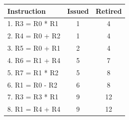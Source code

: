 \documentclass{article}
\begin{document}
\begin{enumerate}
\begin{figure}[H]
\begin{minipage}[t]{0.45\textwidth}
            \centering
            \renewcommand{\arraystretch}{1.2} %
            \setlength{\tabcolsep}{3pt} %
            \begin{tabular}{|p{3.4cm}|c|c|}
                \hline
                \textbf{Instruction} & \textbf{Issued} & \textbf{Retired} \\ \hline
                1. R3 = R0 * R1 & 1 & 4 \\ \hline 
                2. R4 = R0 + R2 & 1 & 4 \\ \hline 
                3. R5 = R0 + R1 & 2 & 4 \\ \hline 
                4. R6 = R1 + R4 & 5 & 7 \\ \hline 
                5. R7 = R1 * R2 & 5 & 8 \\ \hline
                6. R1 = R0 - R2 & 6 & 8 \\ \hline
                7. R3 = R3 * R1 & 9 & 12 \\ \hline 
                8. R1 = R4 + R4 & 9 & 12 \\ \hline 
            \end{tabular}
            \vspace{1em} %
            \raggedright


\end{minipage}
\end{figure}
\end{enumerate}
\end{document}
